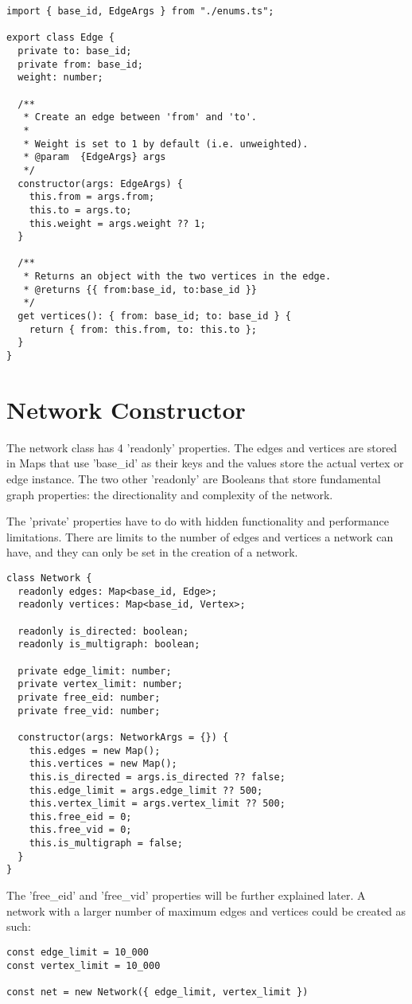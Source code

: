 \begin{verbatim}
import { base_id, EdgeArgs } from "./enums.ts";

export class Edge {
  private to: base_id;
  private from: base_id;
  weight: number;

  /**
   * Create an edge between 'from' and 'to'.
   *
   * Weight is set to 1 by default (i.e. unweighted).
   * @param  {EdgeArgs} args
   */
  constructor(args: EdgeArgs) {
    this.from = args.from;
    this.to = args.to;
    this.weight = args.weight ?? 1;
  }

  /**
   * Returns an object with the two vertices in the edge.
   * @returns {{ from:base_id, to:base_id }}
   */
  get vertices(): { from: base_id; to: base_id } {
    return { from: this.from, to: this.to };
  }
}
\end{verbatim}

\section{Network Constructor}

The network class has 4 'readonly' properties. The edges and vertices are stored in Maps that use 'base\_id' as their keys and the values store the actual vertex or edge instance. The two other 'readonly' are Booleans that store fundamental graph properties: the directionality and complexity of the network.

The 'private' properties have to do with hidden functionality and performance limitations. There are limits to the number of edges and vertices a network can have, and they can only be set in the creation of a network.

\begin{verbatim}
class Network {
  readonly edges: Map<base_id, Edge>;
  readonly vertices: Map<base_id, Vertex>;

  readonly is_directed: boolean;
  readonly is_multigraph: boolean;

  private edge_limit: number;
  private vertex_limit: number;
  private free_eid: number;
  private free_vid: number;

  constructor(args: NetworkArgs = {}) {
    this.edges = new Map();
    this.vertices = new Map();
    this.is_directed = args.is_directed ?? false;
    this.edge_limit = args.edge_limit ?? 500;
    this.vertex_limit = args.vertex_limit ?? 500;
    this.free_eid = 0;
    this.free_vid = 0;
    this.is_multigraph = false;
  }
}
\end{verbatim}

The 'free\_eid' and 'free\_vid' properties will be further explained later. A network with a larger number of maximum edges and vertices could be created as such:

\begin{verbatim}
const edge_limit = 10_000
const vertex_limit = 10_000

const net = new Network({ edge_limit, vertex_limit })
\end{verbatim}